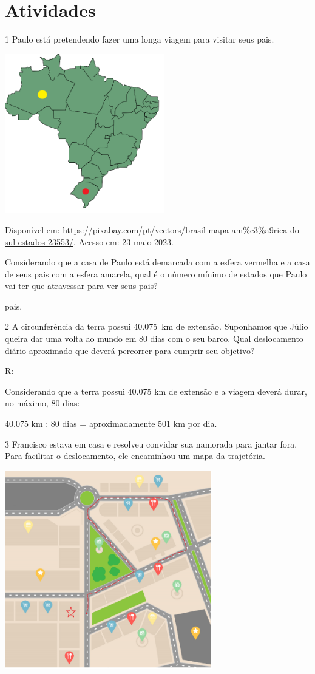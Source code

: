 {\section{Atividades}

\num{1} Paulo está pretendendo fazer uma longa viagem para visitar seus pais.

\includegraphics[width=2.73952in,height=2.725in]{./imgSAEB_8_MAT/media/image36.png}

Disponível em:
\url{https://pixabay.com/pt/vectors/brasil-mapa-am\%c3\%a9rica-do-sul-estados-23553/}.
Acesso em: 23 maio 2023.

Considerando que a casa de Paulo está demarcada com a esfera vermelha e
a casa de seus pais com a esfera amarela, qual é o número mínimo de
estados que Paulo vai ter que atravessar para ver seus pais?

pais.

\num{2} A circunferência da terra possui 40.075~km de extensão. Suponhamos
que Júlio queira dar uma volta ao mundo em 80 dias com o seu barco. Qual
deslocamento diário aproximado que deverá percorrer para cumprir seu
objetivo?

R:

Considerando que a terra possui 40.075 km de extensão e a viagem deverá
durar, no máximo, 80 dias:

40.075 km : 80 dias = aproximadamente 501 km por dia.

\num{3} Francisco estava em casa e resolveu convidar sua namorada para jantar
fora. Para facilitar o deslocamento, ele encaminhou um mapa da
trajetória.

\includegraphics[width=3.55in,height=3.406in]{./imgSAEB_8_MAT/media/image37.png}

}
